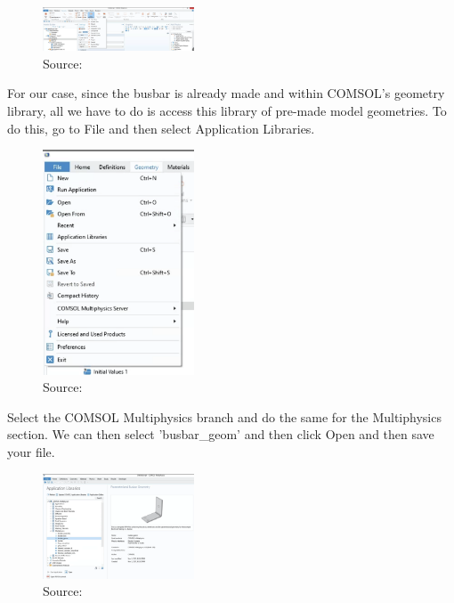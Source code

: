 \begin{figure}[ht!]
  \centering
  \includegraphics[width=0.4\textwidth]{Chapters/Figures/Chapter 3 Figures/Geometry Tab.png}
  \caption{ Source: \cite{}}
  \label{}
\end{figure}

For our case, since the busbar is already made and within COMSOL's geometry library, all we have to do is access this library of pre-made model geometries. To do this, go to File and then select Application Libraries.

\begin{figure}[ht!]
  \centering
  \includegraphics[width=0.4\textwidth]{Chapters/Figures/Chapter 3 Figures/Application Libraries Button.png}
  \caption{ Source: \cite{}}
  \label{}
\end{figure}

Select the COMSOL Multiphysics branch and do the same for the Multiphysics section. We can then select 'busbar\_geom' and then click Open and then save your file.

\begin{figure}[ht!]
  \centering
  \includegraphics[width=0.4\textwidth]{Chapters/Figures/Chapter 3 Figures/Application Libraries.png}
  \caption{ Source: \cite{}}
  \label{}
\end{figure}

